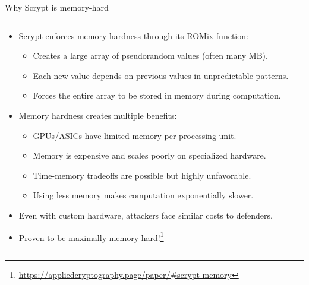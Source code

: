 \documentclass[aspectratio=169, lualatex, handout]{beamer}
\begin{document}
\begin{frame}{Why Scrypt is memory-hard}
	\begin{columns}[c]
		\begin{column}{1\textwidth}
			\begin{itemize}
				\item Scrypt enforces memory hardness through its ROMix function:
				      \begin{itemize}
					      \item Creates a large array of pseudorandom values (often many MB).
					      \item Each new value depends on previous values in unpredictable patterns.
					      \item Forces the entire array to be stored in memory during computation.
				      \end{itemize}
				\item Memory hardness creates multiple benefits:
				      \begin{itemize}
					      \item GPUs/ASICs have limited memory per processing unit.
					      \item Memory is expensive and scales poorly on specialized hardware.
					      \item Time-memory tradeoffs are possible but highly unfavorable.
					      \item Using less memory makes computation exponentially slower.
				      \end{itemize}
				\item Even with custom hardware, attackers face similar costs to defenders.
				\item Proven to be maximally memory-hard!\footnote{\url{https://appliedcryptography.page/paper/\#scrypt-memory}}
			\end{itemize}
		\end{column}
	\end{columns}
\end{frame}
\end{document}
